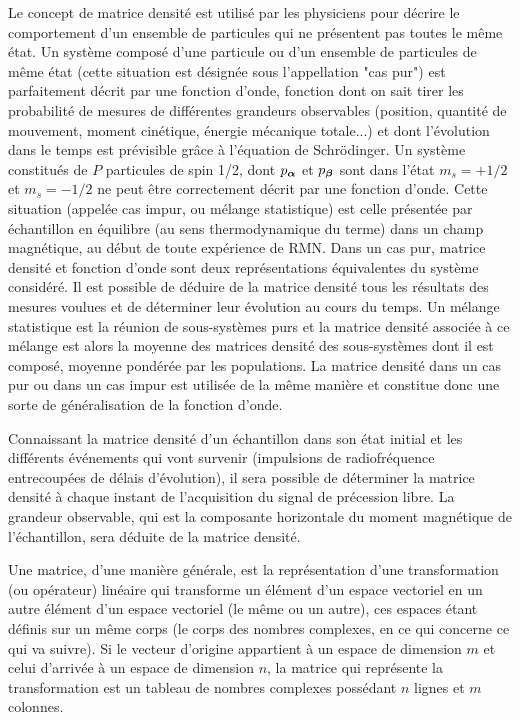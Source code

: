 Le concept de matrice densité est utilisé par les physiciens pour décrire le 
comportement d'un ensemble de particules qui ne présentent pas toutes le même état. 
Un système composé d'une particule ou d'un ensemble de particules de 
même état (cette situation est désignée sous l'appellation "cas pur") est 
parfaitement décrit par une fonction d'onde, fonction dont on sait tirer les probabilité de 
mesures de différentes grandeurs observables (position, quantité de mouvement, 
moment cinétique, énergie mécanique totale...) et dont l'évolution dans le temps est 
prévisible grâce à l'équation de Schrödinger.
Un système constitués de $P$ particules de spin 1/2, dont $p_{\boldsymbol{\alpha}}$ et $p_{\boldsymbol{\beta}}$ sont 
dans l'état $m_s = +1/2$ et $m_s = -1/2$ ne peut être correctement 
décrit par une fonction d'onde.
Cette situation (appelée cas impur, ou mélange statistique) est celle
présentée par échantillon en équilibre (au sens thermodynamique du terme) dans un 
champ magnétique, au début de toute expérience de RMN. 
Dans un cas pur, matrice densité et fonction d'onde sont deux représentations 
équivalentes du système considéré. 
Il est possible de déduire de la matrice densité tous les résultats des 
mesures voulues et de déterminer leur évolution au cours du temps. 
Un mélange statistique est la réunion de sous-systèmes purs et 
la matrice densité associée à ce mélange est alors la moyenne 
des matrices densité des sous-systèmes dont il est composé, 
moyenne pondérée par les populations.
La matrice densité dans un cas pur ou dans un cas impur est utilisée de la même manière et 
constitue donc une sorte de généralisation de la fonction d'onde.

Connaissant la matrice densité d'un échantillon dans son état initial et les différents 
événements qui vont survenir (impulsions de radiofréquence entrecoupées de délais 
d'évolution), il sera possible de déterminer la matrice densité à chaque instant de 
l'acquisition du signal de précession libre. 
La grandeur observable, qui est la 
composante horizontale du moment magnétique de l'échantillon, sera déduite de la 
matrice densité.

Une matrice, d'une manière générale, est la représentation d'une transformation (ou opérateur)
linéaire qui transforme un élément d'un espace vectoriel en un autre élément
d'un espace vectoriel (le même ou un autre), ces espaces étant définis sur un même corps
(le corps des nombres complexes, en ce qui concerne ce qui va suivre).
Si le vecteur d'origine appartient à un espace de dimension $m$ et celui
d'arrivée à un espace de dimension $n$,
la matrice qui représente la transformation est un tableau de nombres complexes
possédant $n$ lignes et $m$ colonnes.

